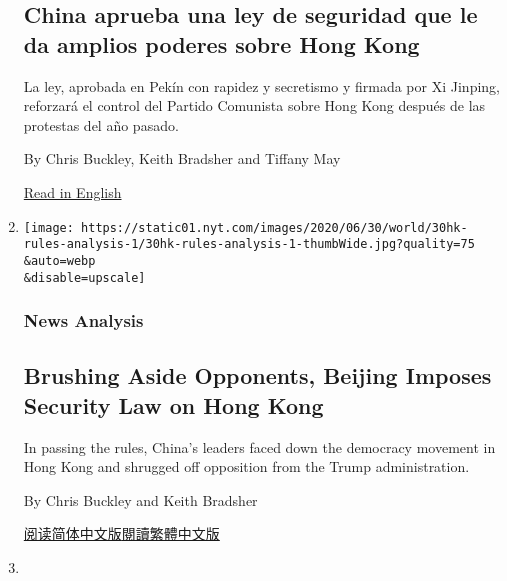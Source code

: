 \begin{enumerate}
  \hypertarget{china-aprueba-una-ley-de-seguridad-que-le-da-amplios-poderes-sobre-hong-kong}{%
  \subsection{China aprueba una ley de seguridad que le da amplios
  poderes sobre Hong
  Kong}\label{china-aprueba-una-ley-de-seguridad-que-le-da-amplios-poderes-sobre-hong-kong}}

  La ley, aprobada en Pekín con rapidez y secretismo y firmada por Xi
  Jinping, reforzará el control del Partido Comunista sobre Hong Kong
  después de las protestas del año pasado.

  By Chris Buckley, Keith Bradsher and Tiffany May

  \href{https://www.nytimes.com/2020/06/29/world/asia/china-hong-kong-security-law-rules.html}{Read
  in English}
\item
  \href{/2020/06/30/world/asia/china-critics-security-law-hong-kong.html}{}

  \texttt{[image: https://static01.nyt.com/images/2020/06/30/world/30hk-rules-analysis-1/30hk-rules-analysis-1-thumbWide.jpg?quality=75\\\&auto=webp\\\&disable=upscale]}

  \hypertarget{news-analysis}{%
  \subsubsection{News Analysis}\label{news-analysis}}

  \hypertarget{brushing-aside-opponents-beijing-imposes-security-law-on-hong-kong}{%
  \subsection{Brushing Aside Opponents, Beijing Imposes Security Law on
  Hong
  Kong}\label{brushing-aside-opponents-beijing-imposes-security-law-on-hong-kong}}

  In passing the rules, China's leaders faced down the democracy
  movement in Hong Kong and shrugged off opposition from the Trump
  administration.

  By Chris Buckley and Keith Bradsher

  \href{https://cn.nytimes.com/china/20200701/china-critics-security-law-hong-kong/}{阅读简体中文版}\href{https://cn.nytimes.com/china/20200701/china-critics-security-law-hong-kong/zh-ha}{閱讀繁體中文版}
\item
  \href{/2020/06/29/world/asia/china-hong-kong-security-law-rules.html}{}


\end{enumerate}

